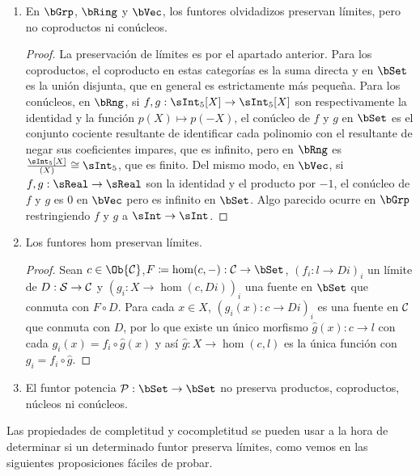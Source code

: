 \begin{example}
\begin{enumerate}
\begin{proof}
      hipótesis existe un único $h:\hat x\to l$ con cada
      ${\hat g}_i=f_i\circ h$, con lo que $g_i=Ff_i\circ(Fh\circ u)$. La
      unicidad de $Fh\circ u$ es clara si $u$ es inyectiva, lo que ocurre si
      $\cC$ tiene algún objeto que, como conjunto, tiene al menos 2 elementos,
      pero si este no es el caso sólo existe una función $x\to l$ a lo sumo.
    \end{proof}
  \item En $\bGrp$, $\bRing$ y $\bVec$, los funtores
    olvidadizos preservan límites, pero no coproductos ni conúcleos.
    \begin{proof}
      La preservación de límites es por el apartado anterior. Para los
      coproductos, el coproducto en estas categorías es la suma directa y en
      $\bSet$ es la unión disjunta, que en general es estrictamente más
      pequeña. Para los conúcleos, en $\bRng$, si $f,g:\sInt_5[X]\to\sInt_5[X]$
      son respectivamente la identidad y la función $p(X)\mapsto p(-X)$, el
      conúcleo de $f$ y $g$ en $\bSet$ es el conjunto cociente resultante de
      identificar cada polinomio con el resultante de negar sus coeficientes
      impares, que es infinito, pero en $\bRng$ es
      $\frac{\sInt_5[X]}{(X)}\cong\sInt_5$, que es finito. Del mismo modo, en
      $\bVec$, si $f,g:\sReal\to\sReal$ son la identidad y el producto por $-1$,
      el conúcleo de $f$ y $g$ es 0 en $\bVec$ pero es infinito en $\bSet$. Algo
      parecido ocurre en $\bGrp$ restringiendo $f$ y $g$ a $\sInt\to\sInt$.
    \end{proof}
  \item Los funtores hom preservan límites.
    \begin{proof}
      Sean $c\in\Ob{\cC}$,$F\coloneqq\hom(c,-):\cC\to\bSet$, $(f_i:l\to Di)_i$
      un límite de $D:\mathcal{S}\to\mathcal{C}$ y $(g_i:X\to\hom(c,Di))_i$ una fuente en
      $\bSet$ que conmuta con $F\circ D$. Para cada $x\in X$,
      $(g_i(x):c\to Di)_i$ es una fuente en $\cC$ que conmuta con $D$, por lo
      que existe un único morfismo $\hat g(x):c\to l$ con cada
      $g_i(x)=f_i\circ\hat g(x)$ y así $\hat g:X\to\hom(c,l)$ es la única
      función con $g_i=f_i\circ\hat g$.
    \end{proof}
  \item El funtor potencia $\power:\bSet\to\bSet$ no preserva productos,
    coproductos, núcleos ni conúcleos.
  \end{enumerate}
\end{example}

Las propiedades de completitud y cocompletitud se pueden usar a la hora de
determinar si un determinado funtor preserva límites, como vemos en las
siguientes proposiciones fáciles de probar.

